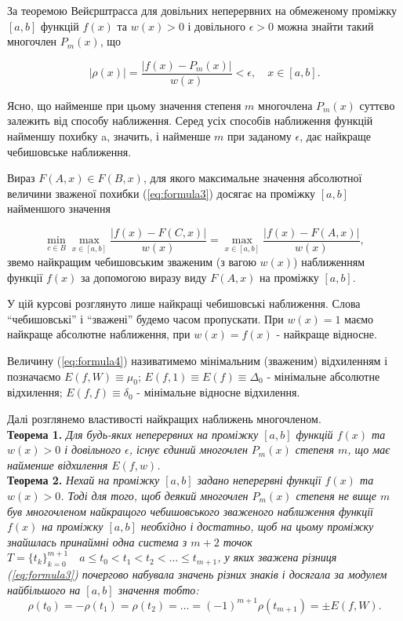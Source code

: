 \documentclass[ukrainian,14pt]{extarticle}
\def\ab{[a,b]}
\begin{document}
За теоремою Вейєрштрасса для довільних неперервних на обмеженому проміжку $[a,b]$   
функцій $f(x)$ та $w(x) > 0$ і довільного $\epsilon > 0$ можна знайти такий многочлен $P_m(x)$, що

$$|\rho(x)| = \frac{|f(x) - P_m(x)|}{w(x)} < \epsilon, \quad x \in [a,b].$$

Ясно, що найменше при цьому значення степеня $m$ многочлена $P_m(x)$ суттєво залежить від способу наближення. Серед усіх способів наближення функцій найменшу похибку a, значить, і найменше $m$ при заданому $\epsilon$, дає найкраще чебишовське наближення.

Вираз $F(A,x) \in F(B,x)$, для якого максимальне значення абсолютної величини зваженої похибки (\ref{eq:formula3}) досягає на проміжку $[a,b]$ найменшого значення

\begin{equation}\label{eq:formula4}
\min_{c \in B} \max_{x \in [a,b]} \frac{|f(x) - F(C,x)|}{w(x)} = \max_{x \in [a,b]} \frac{|f(x) - F(A,x)|}{w(x)},
\end{equation}
звемо найкращим чебишовським зваженим (з вагою $w(x)$) наближенням функції $f(x)$ за допомогою виразу виду $F(A,x)$ на проміжку $[a,b]$.

У цій курсові розглянуто лише найкращі чебишовські наближення. Слова ``чебишовські'' і ``зважені'' будемо часом пропускати. При $w(x) = 1$ маємо найкраще абсолютне наближення, при $w(x) = f(x)$ - найкраще відносне.

Величину (\ref{eq:formula4}) називатимемо мінімальним (зваженим) відхиленням і позначаємо $E(f,W)\equiv\mu_0$; $E(f,1) \equiv E(f) \equiv \Delta_0$ - мінімальне абсолютне відхилення; $E(f,f) \equiv \delta_0$ - мінімальне відносне відхилення.

Далі розглянемо властивості найкращих наближень многочленом.\\

\noindent
\textbf{Теорема 1.}\textit{
Для будь-яких неперервних на проміжку $[a,b]$ функцій $f(x)$ та $w(x) > 0$ і довільного $\epsilon$, існує єдиний многочлен $P_m(x)$ степеня $m$, що має найменше відхилення $E(f,w)$.}\\

\noindent
\textbf{Теорема 2.}\textit{
Нехай на проміжку $[a,b]$ задано неперервні функції $f(x)$ та $w(x) > 0$.
Тоді для того, щоб деякий многочлен $P_m(x)$ степеня не вище $m$ був многочленом найкращого чебишовського зваженого наближення функції $f(x)$ на проміжку $\ab$ необхідно і достатньо, щоб на цьому проміжку знайшлась принаймні одна система з $m+2$ точок \\ $T=\{t_k\}_{k=0}^{m+1} \quad a \leq t_0 < t_1 < t_2 < \ldots \leq t_{m+1}$, у яких зважена різниця (\ref{eq:formula3}) почергово набувала значень різних знаків і досягала за модулем найбільшого на $\ab$ значення тобто:
}
\begin{equation}\label{eq:formula5}
\rho(t_0) = -\rho(t_1) = \rho(t_2) = \ldots = (-1)^{m+1}\rho(t_{m+1}) = \pm E(f,W).
\end{equation}\\
\end{document}
